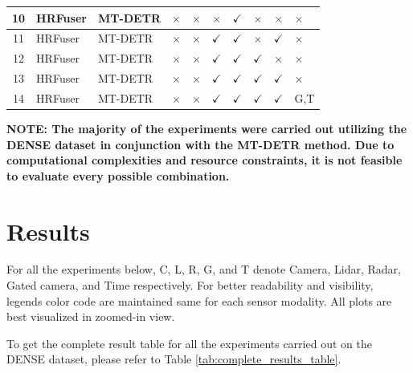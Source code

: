 \documentclass[report.tex]{subfiles}
\begin{document}
\begin{itemize}
\begin{table}[h!]
\begin{tabular}{|c|l|l|c|c|c|c|c|c|l|}
                    \hline
                    10 & HRFuser & MT-DETR & $\times$ & $\times$ & $\times$ & $\checkmark$ & $\times$ & $\times$ & $\times$ \\
                    \hline
                    11 & HRFuser & MT-DETR & $\times$ & $\times$ & $\checkmark$ & $\checkmark$ & $\times$ & $\checkmark$ & $\times$ \\
                    \hline
                    12 & HRFuser & MT-DETR & $\times$ & $\times$ & $\checkmark$ & $\checkmark$ & $\checkmark$ & $\times$ & $\times$ \\
                    \hline
                    13 & HRFuser & MT-DETR & $\times$ & $\times$ & $\checkmark$ & $\checkmark$ & $\checkmark$ & $\checkmark$ & $\times$ \\
                    \hline
                    14 & HRFuser & MT-DETR & $\times$ & $\times$ & $\checkmark$ & $\checkmark$ & $\checkmark$ & $\checkmark$ & G,T \\
                    \hline
                    \end{tabular}
                    \label{tab:experiment_combinations}
                \end{table}
                
            \textbf{NOTE: The majority of the experiments were carried out utilizing the DENSE dataset in conjunction with the MT-DETR method. Due to computational complexities and resource constraints, it is not feasible to evaluate every possible combination.}
                
        \end{itemize}
    

    \section{Results}

    For all the experiments below, C, L, R, G, and T denote Camera, Lidar, Radar, Gated camera, and Time respectively. For better readability and visibility, legends color code are maintained same for each sensor modality. All plots are best visualized in zoomed-in view.

    To get the complete result table for all the experiments carried out on the DENSE dataset, please refer to Table \ref{tab:complete_results_table}.
\end{document}
